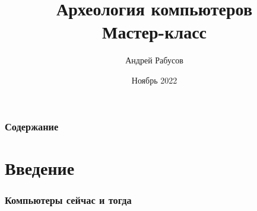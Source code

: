\documentclass[t,aspectratio=169]{beamer}
\author{Андрей Рабусов}
\date{Ноябрь 2022}
\title{Археология компьютеров\\
Мастер-класс}
\begin{document}
\begin{frame}
    \frametitle{Содержание}
    \tableofcontents[sectionstyle=show,subsectionstyle=show]
\end{frame}

\section*{Введение}
\begin{frame}
    \frametitle{Компьютеры сейчас и тогда}
    \begin{figure}
        \begin{centering}
\end{centering}
\end{figure}
\end{frame}
\end{document}
